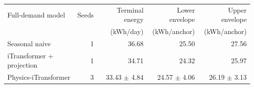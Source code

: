 \begin{tabular}{lrrrr}
\toprule
Full-demand model & Seeds & Terminal energy & Lower envelope & Upper envelope \\
 & & (kWh/day) & (kWh/anchor) & (kWh/anchor) \\
\midrule
Seasonal naive & 1 & 36.68 & 25.50 & 27.56 \\
iTransformer + projection & 1 & 34.71 & 24.32 & 25.97 \\
Physics-iTransformer & 3 & 33.43 $\pm$ 4.84 & 24.57 $\pm$ 4.06 & 26.19 $\pm$ 3.13 \\
\bottomrule
\end{tabular}
